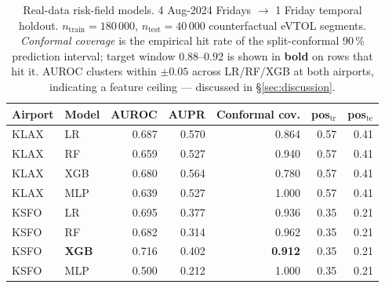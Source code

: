 \begin{table}[t]
\centering
\caption{Real-data risk-field models. 4 Aug-2024 Fridays $\rightarrow$ 1 Friday temporal holdout. $n_{\textrm{train}}=180\,000$, $n_{\textrm{test}}=40\,000$ counterfactual eVTOL segments. \emph{Conformal coverage} is the empirical hit rate of the split-conformal 90\,\% prediction interval; target window $0.88$--$0.92$ is shown in \textbf{bold} on rows that hit it. AUROC clusters within $\pm 0.05$ across LR/RF/XGB at both airports, indicating a feature ceiling — discussed in \S\ref{sec:discussion}.}
\label{tab:risk}
\begin{tabular}{llrrr rr}
\toprule
Airport & Model & AUROC & AUPR & Conformal cov. & pos$_{\textrm{tr}}$ & pos$_{\textrm{te}}$ \\
\midrule
KLAX & LR & 0.687 & 0.570 & 0.864 & 0.57 & 0.41 \\
KLAX & RF & 0.659 & 0.527 & 0.940 & 0.57 & 0.41 \\
KLAX & XGB & 0.680 & 0.564 & 0.780 & 0.57 & 0.41 \\
KLAX & MLP & 0.639 & 0.527 & 1.000 & 0.57 & 0.41 \\
\midrule
KSFO & LR & 0.695 & 0.377 & 0.936 & 0.35 & 0.21 \\
KSFO & RF & 0.682 & 0.314 & 0.962 & 0.35 & 0.21 \\
KSFO & \textbf{XGB} & 0.716 & 0.402 & \textbf{0.912} & 0.35 & 0.21 \\
KSFO & MLP & 0.500 & 0.212 & 1.000 & 0.35 & 0.21 \\
\bottomrule
\end{tabular}
\end{table}
